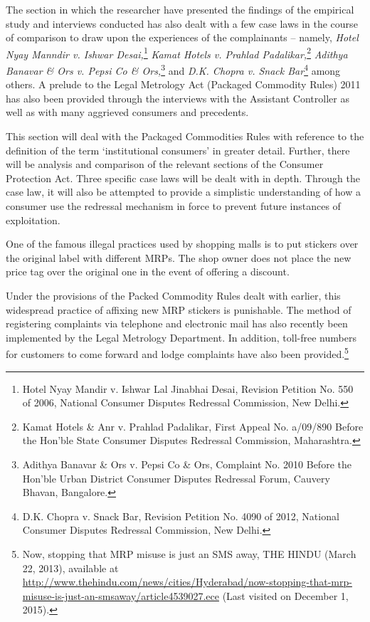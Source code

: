 \begin{multicols}{2}
\vspace{-.2cm}

\noi
The section in which the researcher have presented the findings of the empirical study and
interviews conducted has also dealt with a few case laws in the course of comparison to draw
upon the experiences of the complainants – namely, \textit{Hotel Nyay Manndir v. Ishwar Desai,}\footnote{Hotel Nyay Mandir v. Ishwar Lal Jinabhai Desai, Revision Petition No. 550 of 2006, National Consumer Disputes Redressal Commission, New Delhi.} \textit{Kamat Hotels v. Prahlad Padalikar,}\footnote{Kamat Hotels \& Anr v. Prahlad Padalikar, First Appeal No. a/09/890 Before the Hon’ble State Consumer Disputes Redressal Commission, Maharashtra.} \textit{Adithya Banavar \& Ors v. Pepsi Co \& Ors,}\footnote{Adithya Banavar \& Ors v. Pepsi Co \& Ors, Complaint No. 2010 Before the Hon’ble Urban District Consumer Disputes Redressal Forum, Cauvery Bhavan, Bangalore.} and \textit{D.K. Chopra v. Snack Bar}\footnote{D.K. Chopra v. Snack Bar, Revision Petition No. 4090 of 2012, National Consumer Disputes Redressal Commission, New Delhi.} among others. A prelude to the Legal Metrology Act (Packaged Commodity Rules) 2011 has also been provided through the interviews with the Assistant Controller as well as with many aggrieved consumers and precedents.

\vspace{-.2cm}

\noi
This section will deal with the Packaged Commodities Rules with reference to the definition
of the term ‘institutional consumers’ in greater detail. Further, there will be analysis and
comparison of the relevant sections of the Consumer Protection Act. Three specific case laws
will be dealt with in depth. Through the case law, it will also be attempted to provide a
simplistic understanding of how a consumer use the redressal mechanism in force to prevent
future instances of exploitation.

\vspace{-.2cm}

\noi
One of the famous illegal practices used by shopping malls is to put stickers over the original
label with different MRPs. The shop owner does not place the new price tag over the original
one in the event of offering a discount.

\vspace{-.15cm}

\noi
Under the provisions of the Packed Commodity Rules dealt with earlier, this widespread
practice of affixing new MRP stickers is punishable. The method of registering complaints via
telephone and electronic mail has also recently been implemented by the Legal Metrology
Department. In addition, toll-free numbers for customers to come forward and lodge
complaints have also been provided.\footnote{Now, stopping that MRP misuse is just an SMS away, THE HINDU (March 22, 2013), available at  \url{http://www.thehindu.com/news/cities/Hyderabad/now-stopping-that-mrp-misuse-is-just-an-smsaway/article4539027.ece} (Last visited on December 1, 2015).}


\end{multicols}
